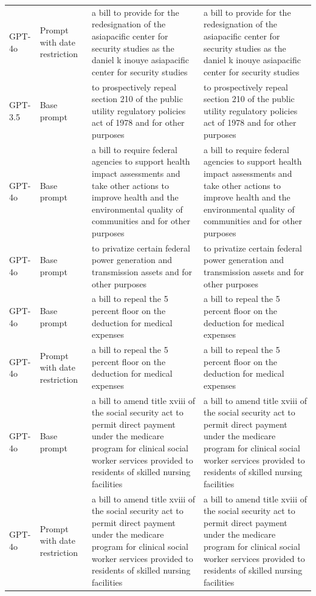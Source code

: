 \begin{longtable}{>{\raggedright\arraybackslash}p{1.4cm}>{\raggedright\arraybackslash}p{1.4cm}>{\raggedright\arraybackslash}p{5.5cm}>{\raggedright\arraybackslash}p{5.5cm}}
GPT-4o & Prompt with date restriction & a bill to provide for the redesignation of the asiapacific center for security studies as the daniel k inouye asiapacific center for security studies & a bill to provide for the redesignation of the asiapacific center for security studies as the daniel k inouye asiapacific center for security studies\\
GPT-3.5 & Base prompt & to prospectively repeal section 210 of the public utility regulatory policies act of 1978 and for other purposes & to prospectively repeal section 210 of the public utility regulatory policies act of 1978 and for other purposes\\
GPT-4o & Base prompt & a bill to require federal agencies to support health impact assessments and take other actions to improve health and the environmental quality of communities and for other purposes & a bill to require federal agencies to support health impact assessments and take other actions to improve health and the environmental quality of communities and for other purposes\\
GPT-4o & Base prompt & to privatize certain federal power generation and transmission assets and for other purposes & to privatize certain federal power generation and transmission assets and for other purposes\\
GPT-4o & Base prompt & a bill to repeal the 5 percent floor on the deduction for medical expenses & a bill to repeal the 5 percent floor on the deduction for medical expenses\\
GPT-4o & Prompt with date restriction & a bill to repeal the 5 percent floor on the deduction for medical expenses & a bill to repeal the 5 percent floor on the deduction for medical expenses\\
GPT-4o & Base prompt & a bill to amend title xviii of the social security act to permit direct payment under the medicare program for clinical social worker services provided to residents of skilled nursing facilities & a bill to amend title xviii of the social security act to permit direct payment under the medicare program for clinical social worker services provided to residents of skilled nursing facilities\\
GPT-4o & Prompt with date restriction & a bill to amend title xviii of the social security act to permit direct payment under the medicare program for clinical social worker services provided to residents of skilled nursing facilities & a bill to amend title xviii of the social security act to permit direct payment under the medicare program for clinical social worker services provided to residents of skilled nursing facilities\\

\end{longtable}
